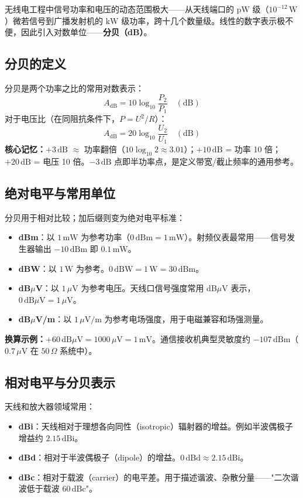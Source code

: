 \documentclass[12pt,UTF8]{ctexbook}
\begin{document}
无线电工程中信号功率和电压的动态范围极大——从天线端口的 $\mathrm{pW}$ 级（$10^{-12}\,\mathrm{W}$）微若信号到广播发射机的 $\mathrm{kW}$ 级功率，跨十几个数量级。线性的数字表示极不便，因此引入对数单位——\textbf{分贝（dB）}。

\subsection{分贝的定义}

分贝是两个功率之比的常用对数表示：
\[
\boxed{A_{\mathrm{dB}} = 10\log_{10}\frac{P_2}{P_1} \quad (\mathrm{dB})}
\]
对于电压比（在同阻抗条件下，$P = U^2/R$）：
\[
A_{\mathrm{dB}} = 20\log_{10}\frac{U_2}{U_1} \quad (\mathrm{dB})
\]
\textbf{核心记忆：}$+3\,\mathrm{dB}$ $\approx$ 功率翻倍（$10\log_{10}2\approx3.01$）；$+10\,\mathrm{dB}$ = 功率 10 倍；$+20\,\mathrm{dB}$ = 电压 10 倍。$-3\,\mathrm{dB}$ 点即半功率点，是定义带宽/截止频率的通用参考。

\subsection{绝对电平与常用单位}

分贝用于相对比较；加后缀则变为绝对电平标准：
\begin{itemize}
  \item \textbf{dBm}：以 $1\,\mathrm{mW}$ 为参考功率（$0\,\mathrm{dBm} = 1\,\mathrm{mW}$）。射频仪表最常用——信号发生器输出 $-10\,\mathrm{dBm}$ 即 $0.1\,\mathrm{mW}$。
  \item \textbf{dBW}：以 $1\,\mathrm{W}$ 为参考。$0\,\mathrm{dBW} = 1\,\mathrm{W} = 30\,\mathrm{dBm}$。
  \item \textbf{dB$\mu$V}：以 $1\,\mu\mathrm{V}$ 为参考电压。天线口信号强度常用 dB$\mu$V 表示，$0\,\mathrm{dB}\mu\mathrm{V} = 1\,\mu\mathrm{V}$。
  \item \textbf{dB$\mu$V/m}：以 $1\,\mu\mathrm{V/m}$ 为参考电场强度，用于电磁兼容和场强测量。
\end{itemize}
\textbf{换算示例：}$+60\,\mathrm{dB}\mu\mathrm{V} = 1000\,\mu\mathrm{V} = 1\,\mathrm{mV}$。通信接收机典型灵敏度约 $-107\,\mathrm{dBm}$（$0.7\,\mu\mathrm{V}$ 在 $50\,\Omega$ 系统中）。

\subsection{相对电平与分贝表示}

天线和放大器领域常用：
\begin{itemize}
  \item \textbf{dBi}：天线相对于理想各向同性（isotropic）辐射器的增益。例如半波偶极子增益约 $2.15\,\mathrm{dBi}$。
  \item \textbf{dBd}：相对于半波偶极子（dipole）的增益。$0\,\mathrm{dBd} \approx 2.15\,\mathrm{dBi}$。
  \item \textbf{dBc}：相对于载波（carrier）的电平差。用于描述谐波、杂散分量——"二次谐波低于载波 $60\,\mathrm{dBc}$"。
\end{itemize}
\end{document}
